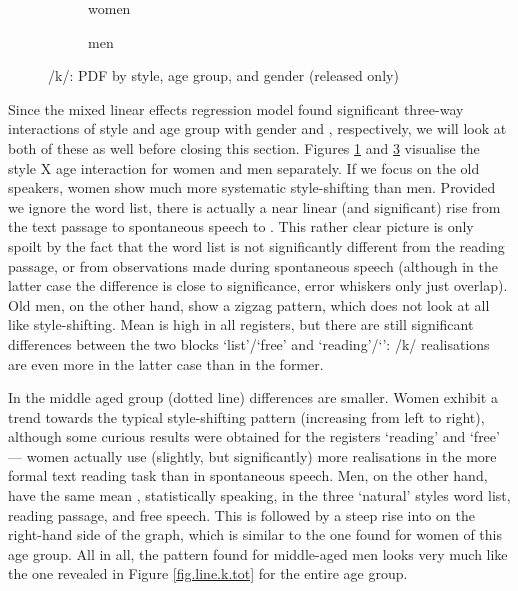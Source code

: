 \begin{figure}[h]
	\centering
	\begin{subfigure}{.49\textwidth}
		\centering
			\resizebox{\linewidth}{!}{} 
		\caption{women}
		\label{fig.line.k.fem}
	\end{subfigure}
	\begin{subfigure}{.49\textwidth}
		\centering
			\resizebox{\linewidth}{!}{} 
		\caption{men}
		\label{fig.line.k.mal}
	\end{subfigure}
	\caption{/k/: PDF by style, age group, and gender (released only)}
\end{figure}

Since the mixed linear effects regression model found significant three-way interactions of style and age group with gender and , respectively, we will look at both of these as well before closing this section.
Figures \ref{fig.line.k.fem} and \ref{fig.line.k.mal} visualise the style X age interaction for women and men separately.
If we focus on the old speakers, women show much more systematic style-shifting than men.
Provided we ignore the word list, there is actually a near linear (and significant) rise from the text passage to spontaneous speech to .
This rather clear picture is only spoilt by the fact that the word list is not significantly different from the reading passage, or from observations made during spontaneous speech (although in the latter case the difference is close to significance, error whiskers only just overlap).
Old men, on the other hand, show a zigzag pattern, which does not look at all like  style-shifting.
Mean  is high in all registers, but there are still significant differences between the two blocks `list'/`free' and `reading'/`': /k/ realisations are even more  in the latter case than in the former.

In the middle aged group (dotted line) differences are smaller.
Women exhibit a trend towards the typical style-shifting pattern (increasing  from left to right), although some curious results were obtained for the registers `reading' and `free' --- women actually use (slightly, but significantly) more  realisations in the more formal text reading task than in spontaneous speech.
Men, on the other hand, have the same mean , statistically speaking, in the three `natural' styles word list, reading passage, and free speech.
This is followed by a steep rise into  on the right-hand side of the graph, which is similar to the one found for women of this age group.
All in all, the pattern found for middle-aged men looks very much like the one revealed in Figure \ref{fig.line.k.tot} for the entire age group.

